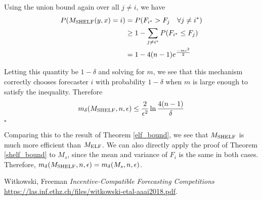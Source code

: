 \documentclass[letterpaper,12pt]{article}
\newcommand{\1}{\mathbbm{1}}
\newcommand*{\QED}{\hfill\ensuremath{\square}}%
\begin{document}
Using the union bound again over all $j \neq i$, we have 
\begin{align*}
  P(M_{\mathrm{SHELF}}(y, x) = i) &= P(F_{i^*} > F_j \quad \forall j \neq i^*) \\
                      &\geq 1 - \sum_{j\neq i^*} P(F_{i^*} \leq F_j) \\
                      &= 1 - 4 (n-1) e^{\frac{- m \epsilon^2}{2}}
\end{align*}

Letting this quantity be $1 - \delta$ and solving for $m$, we see that this mechanism correctly chooses forecaster $i$ with probability $1 - \delta$ when $m$ is large enough to satisfy the inequality. Therefore
\[ m_\delta(M_{\mathrm{SHELF}}, n, \epsilon) \leq \frac{2}{\epsilon^2} \ln \frac{4(n-1)}{\delta} \]
\hfill \QED

Comparing this to the result of Theorem \ref{elf_bound}, we see that $M_{\mathrm{SHELF}}$ is much more efficient than $M_{\mathrm{ELF}}$. We can also directly apply the proof of Theorem \ref{shelf_bound} to $M_s$, since the mean and variance of $F_i$ is the same in both cases. Therefore, $m_\delta(M_{\mathrm{SHELF}}, n, \epsilon) = m_\delta(M_s, n, \epsilon)$. 


\begin{thebibliography}{99}
 Witkowski, Freeman  \emph{Incentive-Compatible Forecasting Competitions} \url{https://las.inf.ethz.ch/files/witkowski-etal-aaai2018.pdf}.

\end{thebibliography}
\end{document}
